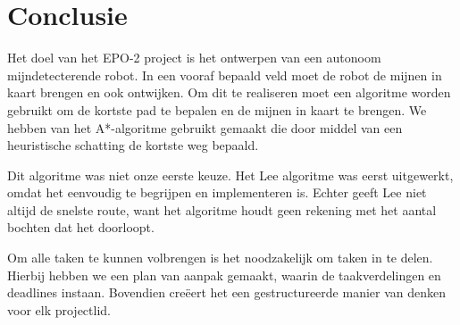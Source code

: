 \documentclass{report}
\def\wl{\par \vspace{\baselineskip}}
\begin{document}
\chapter{Conclusie}
\label{ch: conclusie}

Het doel van het EPO-2 project is het ontwerpen van een autonoom mijndetecterende robot. In een vooraf bepaald veld moet de robot de mijnen in kaart brengen en ook ontwijken. 
Om dit te realiseren moet een algoritme worden gebruikt om de kortste pad te bepalen en de mijnen in kaart te brengen. We hebben van het A*-algoritme gebruikt gemaakt die door middel van een heuristische schatting de kortste weg bepaald. 

Dit algoritme was niet onze eerste keuze. Het Lee algoritme was eerst uitgewerkt, omdat het eenvoudig te begrijpen en implementeren is. Echter geeft Lee niet altijd de snelste route, want het algoritme houdt geen rekening met het aantal bochten dat het doorloopt.\wl


Om alle taken te kunnen volbrengen is het noodzakelijk om taken in te delen. Hierbij hebben we een plan van aanpak gemaakt, waarin de taakverdelingen en deadlines instaan. Bovendien cre\"eert het een gestructureerde manier van denken voor elk projectlid.

	
\end{document}
